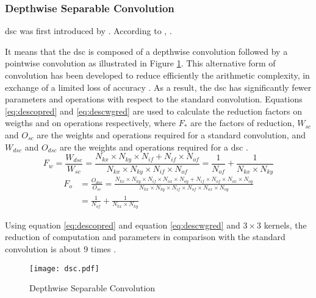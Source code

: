 \subsubsection{Depthwise Separable Convolution}  \label{subs:dsc}
\acrfull{dsc} was first introduced by \textcite{sifre_ecole_2014}. According to \textcite{chollet_xception_2017}, .

It means that the \acrshort{dsc} is composed of a depthwise convolution followed by a pointwise convolution as illustrated in Figure \ref{fig:dsc}. This alternative form of convolution has been developed to reduce efficiently the arithmetic complexity, in exchange of a limited loss of accuracy \cite{liu_fpga-based_2019}. As a result, the \acrshort{dsc} has significantly fewer parameters and operations with respect to the standard convolution. Equations \eqref{eq:descopred} and \eqref{eq:descwgred} are used to calculate the reduction factors on weigths and on operations respectively, where $F_{*}$ are the factors of reduction, $W_{sc}$ and $O_{sc}$ are the weights and operations required for a standard convolution, and $W_{dsc}$ and $O_{dsc}$ are the weights and operations required for a \acrshort{dsc} \cite{liu_fpga-based_2019}.
%
\begin{equation}
    F_w = \frac{W_{dsc}}{W_{sc}} =
    \frac{N_{kx} \times N_{ky} \times N_{if} + N_{if} \times N_{of}}{N_{kx} \times N_{ky} \times N_{if} \times N_{of}} =
    \frac{1}{N_{of}} + \frac{1}{N_{kx} \times N_{ky}}
    \label{eq:descopred}
\end{equation}
\begin{equation}
    \begin{split}
        F_o &= \frac{O_{dsc}}{O_{sc}} = \frac{N_{kx} \times N_{ky} \times N_{if} \times N_{ox} \times N_{oy} + N_{if} \times N_{of} \times N_{ox} \times N_{oy}}{N_{kx} \times N_{ky} \times N_{if} \times N_{of} \times N_{ox} \times N_{oy}} \\
        &= \frac{1}{N_{of}} + \frac{1}{N_{kx} \times N_{ky}}
    \end{split}
    \label{eq:descwgred}
\end{equation}

Using equation \eqref{eq:descopred} and equation \eqref{eq:descwgred} and $3 \times 3$ kernels, the reduction of computation and parameters in comparison with the standard convolution is about 9 times \cite{zhang_channel_2019}.
%
\begin{figure}
    \texttt{[image: dsc.pdf]}
    \caption{Depthwise Separable Convolution}
    \label{fig:dsc}
\end{figure}
